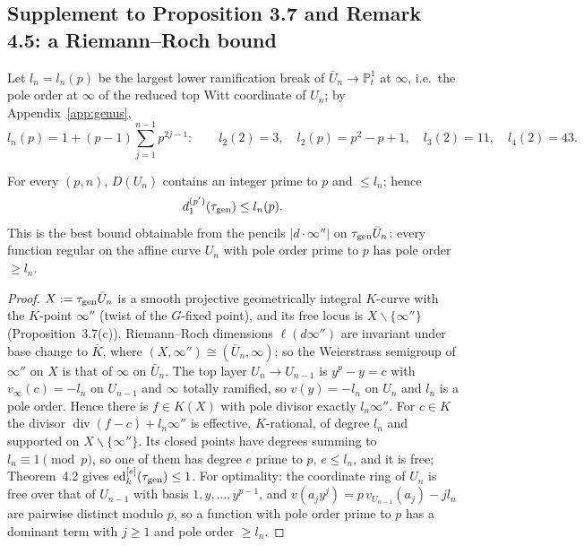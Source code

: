 \subsection{Supplement to Proposition 3.7 and Remark 4.5: a Riemann--Roch bound}

Let $l_n=l_n(p)$ be the largest lower ramification break of $\bar U_n\to\mathbb P^1_t$ at
$\infty$, i.e.\ the pole order at $\infty$ of the reduced top Witt coordinate of $U_n$;
by Appendix~\ref{app:genus},
\begin{equation}\label{eq:ln}
l_n(p)=1+(p-1)\sum_{j=1}^{n-1}p^{2j-1}:\qquad
l_2(2)=3,\quad l_2(p)=p^2-p+1,\quad l_3(2)=11,\quad l_4(2)=43 .
\end{equation}

\begin{theorem}\label{thm:B}
For every $(p,n)$, $D(U_n)$ contains an integer prime to $p$ and $\le l_n$; hence
\[
d_1^{(p')}(\tau_{\mathrm{gen}})\le l_n(p).
\]
This is the best bound obtainable from the pencils $|d\cdot\infty''|$ on
$\tau_{\mathrm{gen}}\bar U_n$: every function regular on the affine curve $U_n$ with pole order prime
to $p$ has pole order $\ge l_n$.
\end{theorem}

\begin{proof}
$X:=\tau_{\mathrm{gen}}\bar U_n$ is a smooth projective geometrically integral $K$-curve with the
$K$-point $\infty''$ (twist of the $G$-fixed point), and its free locus is
$X\smallsetminus\{\infty''\}$ (Proposition~3.7(c)). Riemann--Roch dimensions
$\ell(d\infty'')$ are invariant under base change to $\bar K$, where
$(X,\infty'')\cong(\bar U_n,\infty)$; so the Weierstrass semigroup of $\infty''$ on $X$ is
that of $\infty$ on $\bar U_n$. The top layer $U_n\to U_{n-1}$ is $y^p-y=c$ with
$v_\infty(c)=-l_n$ on $U_{n-1}$ and $\infty$ totally ramified, so $v(y)=-l_n$ on $U_n$
and $l_n$ is a pole order. Hence there is $f\in K(X)$ with pole divisor exactly
$l_n\infty''$. For $c\in K$ the divisor $\operatorname{div}(f-c)+l_n\infty''$ is
effective, $K$-rational, of degree $l_n$ and supported on $X\smallsetminus\{\infty''\}$.
Its closed points have degrees summing to $l_n\equiv1\pmod p$, so one of them has degree
$e$ prime to $p$, $e\le l_n$, and it is free; Theorem~4.2 gives $\operatorname{ed}^{[e]}_k(\tau_{\mathrm{gen}})\le1$.
For optimality: the coordinate ring of $U_n$ is free over that of $U_{n-1}$ with basis
$1,y,\dots,y^{p-1}$, and $v(a_jy^j)=p\,v_{U_{n-1}}(a_j)-jl_n$ are pairwise distinct
modulo $p$, so a function with pole order prime to $p$ has a dominant term with $j\ge1$
and pole order $\ge l_n$.
\end{proof}

